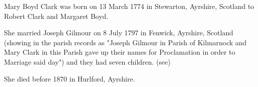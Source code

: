 
Mary Boyd Clark was born on 13 March 1774 in Stewarton, Ayrshire, Scotland to Robert Clark and Margaret Boyd.

She married Joseph Gilmour on 8 July 1797 in Fenwick, Ayrshire, Scotland \cite{MBClarkMarriage} (showing in the parish records as "Joseph Gilmour in Parish of Kilmarnock and Mary Clark in this Parish gave up their names for Proclamation in order to Marriage said day") and they had seven children. (see)

She died before 1870 in Hurlford, Ayrshire.\cite{JosephGilmourDeath}

